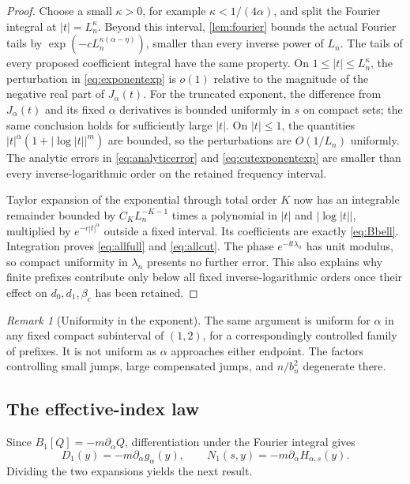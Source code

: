 \documentclass[11pt,a4paper]{article}
\numberwithin{equation}{section}
\theoremstyle{definition}\newtheorem{definition}[theorem]{Definition}
\theoremstyle{remark}\newtheorem{remark}[theorem]{Remark}
\theoremstyle{definition}
\newcommand{\bc}{\beta_{\mathrm c}}\newcommand{\rhoc}{\rho_{\mathrm c}}
\begin{document}
\begin{proof}
Choose a small $\kappa>0$, for example $\kappa<1/(4\alpha)$, and split the
Fourier integral at $|t|=L_n^\kappa$. Beyond this interval,
\cref{lem:fourier} bounds the actual Fourier tails by
$\exp(-cL_n^{\kappa(\alpha-\eta)})$, smaller than every inverse power of
$L_n$. The tails of every proposed coefficient integral have the same
property. On $1\le|t|\le L_n^\kappa$, the perturbation in
\eqref{eq:exponentexp} is $o(1)$ relative to the magnitude of the negative
real part of $J_\alpha(t)$. For the truncated exponent, the difference
from $J_\alpha(t)$ and its fixed $\alpha$ derivatives is bounded uniformly
in $s$ on compact sets; the same conclusion holds for sufficiently large
$|t|$. On $|t|\le1$, the quantities
$|t|^\alpha(1+|\log|t||^m)$ are bounded, so the perturbations are $O(1/L_n)$
uniformly. The analytic errors in \eqref{eq:analyticerror} and
\eqref{eq:cutexponentexp} are smaller than every inverse-logarithmic order
on the retained frequency interval.

Taylor expansion of the exponential through total order $K$ now has an
integrable remainder bounded by $C_K L_n^{-K-1}$ times a polynomial in
$|t|$ and $|\log|t||$, multiplied by $e^{-c|t|^\alpha}$ outside a fixed
interval. Its coefficients are exactly \eqref{eq:Bbell}. Integration
proves \eqref{eq:allfull} and \eqref{eq:allcut}. The phase
$e^{-\ii t\lambda_n}$ has unit modulus, so compact uniformity in
$\lambda_n$ presents no further error. This also explains why finite
prefixes contribute only below all fixed inverse-logarithmic orders once
their effect on $d_0,d_1,\bc$ has been retained.
\end{proof}

\begin{remark}[Uniformity in the exponent]
The same argument is uniform for $\alpha$ in any fixed compact subinterval
of $(1,2)$, for a correspondingly controlled family of prefixes. It is not
uniform as $\alpha$ approaches either endpoint. The factors controlling
small jumps, large compensated jumps, and $n/b_n^2$ degenerate there.
\end{remark}

\subsection{The effective-index law}
Since $B_1[Q]=-m\partial_\alpha Q$, differentiation under the Fourier
integral gives
\begin{equation}\label{eq:firstDN}
 D_1(y)=-m\partial_\alpha g_\alpha(y),\qquad
 N_1(s,y)=-m\partial_\alpha H_{\alpha,s}(y).
\end{equation}
Dividing the two expansions yields the next result.
\end{document}
